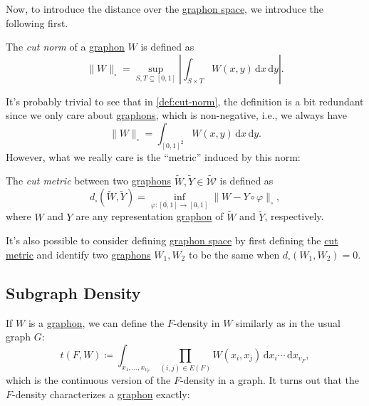 Now, to introduce the distance over the \hyperref[def:graphon-space]{graphon space}, we introduce the following first.

\begin{definition}\label{def:cut-norm}
	The \emph{cut norm} of a \hyperref[def:graphon]{graphon} \(W\) is defined as
	\[
		\lVert W \rVert _{\square }
		= \sup _{S, T \subseteq [0, 1]} \left\lvert \int _{S \times T} W(x, y) \,\mathrm{d} x \,\mathrm{d} y \right\rvert .
	\]
\end{definition}

It's probably trivial to see that in \autoref{def:cut-norm}, the definition is a bit redundant since we only care about \hyperref[def:graphon]{graphons}, which is non-negative, i.e., we always have
\[
	\lVert W \rVert _{\square }
	= \int_{[0, 1]^2} W(x, y) \,\mathrm{d}x \,\mathrm{d} y.
\]
However, what we really care is the ``metric'' induced by this norm:

\begin{definition}\label{def:cut-metric}
	The \emph{cut metric} between two \hyperref[def:graphon]{graphons} \(\widetilde{W} , \widetilde{Y} \in \widetilde{\mathcal{W} } \) is defined as
	\[
		d_{\square}(\widetilde{W} , \widetilde{Y} ) = \inf _{\varphi \colon [0, 1] \to [0, 1]} \lVert W - Y \circ \varphi \rVert _{\square},
	\]
	where \(W\) and \(Y\) are any representation \hyperref[def:graphon]{graphon} of \(\widetilde{W} \) and \(\widetilde{Y} \), respectively.
\end{definition}

\begin{remark}
	It's also possible to consider defining \hyperref[def:graphon-space]{graphon space} by first defining the \hyperref[def:cut-metric]{cut metric} and identify two \hyperref[def:graphon]{graphons} \(W_1, W_2\) to be the same when \(d_{\square }(W_1 , W_2) = 0\).
\end{remark}

\subsection{Subgraph Density}
If \(W\) is a \hyperref[def:graphon]{graphon}, we can define the \(F\)-density in \(W\) similarly as in the usual graph \(G\):
\[
	t(F, W)
	\coloneqq \int_{x_1, \dots , x_{v_F}} \prod_{(i, j) \in E(F)} W(x_i, x_j) \,\mathrm{d} x_i \cdots \,\mathrm{d} x_{v_F},
\]
which is the continuous version of the \(F\)-density in a graph. It turns out that the \(F\)-density characterizes a \hyperref[def:graphon]{graphon} exactly:

